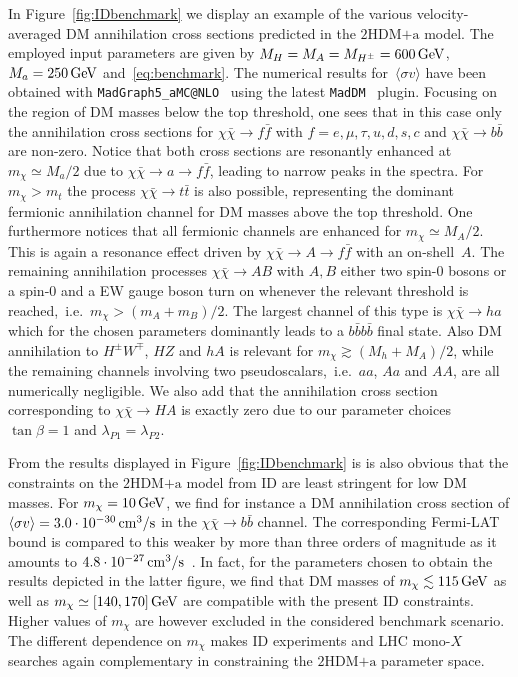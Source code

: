 \documentclass[a4paper, 11pt,notoc]{article}
\newcommand{\hdma}{\ensuremath{\textrm{2HDM+a}}\xspace}
\begin{document}
In Figure~\ref{fig:IDbenchmark} we display  an example of the various velocity-averaged DM annihilation cross sections predicted  in the \hdma model. The employed input parameters are given by $M_H = M_A = M_{H^\pm} = 600 \, {\rm GeV}$, $M_a = 250 \, {\rm GeV}$ and~\eqref{eq:benchmark}. The numerical results for~$\langle \sigma v \rangle$ have been obtained with {\tt MadGraph5\_aMC@NLO}~\cite{Alwall:2014hca}  using the latest  {\tt MadDM}~\cite{Ambrogi:2018jqj} plugin. Focusing on the region of DM masses below the top threshold, one sees that in this case only the annihilation cross sections for $\chi \bar \chi \to f \bar f$ with $f = e, \mu, \tau, u, d, s, c$ and $\chi \bar \chi \to b \bar b$ are non-zero.   Notice that both cross sections are resonantly enhanced at $m_\chi \simeq M_a/2$ due to $\chi \bar \chi \to a \to f \bar f$, leading to narrow peaks in the spectra. For $m_\chi > m_t$ the process $\chi \bar \chi \to t \bar t$ is also possible, representing the dominant fermionic annihilation channel for DM masses above the top threshold. One furthermore notices that all fermionic channels are enhanced for $m_\chi \simeq M_A/2$. This is again a resonance effect driven  by $\chi \bar \chi \to A \to f \bar f$ with an on-shell~$A$. The remaining annihilation processes $\chi \bar \chi \to A B$ with $A,B$ either {\color{red} two spin-0 bosons or a spin-0} and a EW gauge boson turn on whenever the relevant threshold is reached,~i.e.~$m_\chi > (m_A + m_B)/2$. The largest channel of this type is $\chi \bar \chi \to ha$ which for the chosen parameters dominantly leads to a $b \bar b b \bar b$ final state. Also DM annihilation to  $H^\pm W^\mp$, $HZ$ and $hA$ is relevant for $m_\chi \gtrsim (M_h + M_A)/2$, while the remaining channels involving two pseudoscalars,~i.e.~$aa$, $Aa$ and $AA$, are all numerically negligible. We also add that the annihilation cross section corresponding to $
\chi \bar \chi \to HA$ is exactly zero due to our parameter choices  $\tan \beta = 1$ and $\lambda_{P1} = \lambda_{P2}$.  

From the results displayed in Figure~\ref{fig:IDbenchmark} is is also obvious that the constraints on the \hdma model from ID are  least stringent for low DM masses. For $m_\chi = 10 \, {\rm GeV}$, we find for instance a DM annihilation cross section   of  $\langle \sigma v \rangle = 3.0 \cdot 10^{-30} \, {\rm cm}^3/{\rm s}$ in the $\chi \bar \chi \to b \bar b$ channel. The corresponding Fermi-LAT bound is compared to this weaker by more than three orders of magnitude as it amounts to $4.8 \cdot 10^{-27} \, {\rm cm}^3/{\rm s}$~\cite{Fermi-LAT:2016uux}. In fact, for the parameters chosen to obtain the results depicted in the latter figure, we find that DM masses of $m_\chi \lesssim 115 \, {\rm GeV}$ as well as $m_\chi \simeq [140, 170 ] \, {\rm GeV}$ are compatible with the present ID constraints. Higher values  of $m_\chi$ are however excluded in the considered benchmark scenario. The different dependence on $m_\chi$ makes ID experiments and LHC mono-$X$ searches   again complementary in constraining the \hdma parameter space. 
\end{document}
